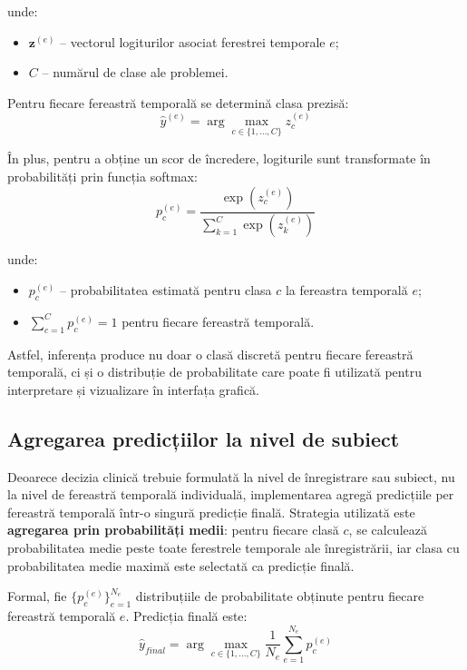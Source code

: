 \documentclass[12pt,a4paper]{report}
\theoremstyle{definition}
\theoremstyle{remark}
\begin{document}
\noindent unde:
\begin{itemize}
    \item $\mathbf{z}^{(e)}$ -- vectorul logiturilor asociat ferestrei temporale $e$;
    \item $C$ -- numărul de clase ale problemei.
\end{itemize}

Pentru fiecare fereastră temporală se determină clasa prezisă:
\begin{equation}
    \hat{y}^{(e)} = \arg\max_{c \in \{1,\ldots,C\}} z_c^{(e)}
    \label{eq:epoch_prediction}
\end{equation}

În plus, pentru a obține un scor de încredere, logiturile sunt transformate în probabilități prin funcția softmax:
\begin{equation}
    p_c^{(e)} = \frac{\exp(z_c^{(e)})}{\sum_{k=1}^{C} \exp(z_k^{(e)})}
    \label{eq:epoch_softmax}
\end{equation}

\noindent unde:
\begin{itemize}
    \item $p_c^{(e)}$ -- probabilitatea estimată pentru clasa $c$ la fereastra temporală $e$;
    \item $\sum_{c=1}^{C} p_c^{(e)} = 1$ pentru fiecare fereastră temporală.
\end{itemize}

Astfel, inferența produce nu doar o clasă discretă pentru fiecare fereastră temporală, ci și o distribuție de probabilitate care poate fi utilizată pentru interpretare și vizualizare în interfața grafică.

\subsection{Agregarea predicțiilor la nivel de subiect}

Deoarece decizia clinică trebuie formulată la nivel de înregistrare sau subiect, nu la nivel de fereastră temporală individuală, implementarea agregă predicțiile per fereastră temporală într-o singură predicție finală. Strategia utilizată este \textbf{agregarea prin probabilități medii}: pentru fiecare clasă $c$, se calculează probabilitatea medie peste toate ferestrele temporale ale înregistrării, iar clasa cu probabilitatea medie maximă este selectată ca predicție finală.

Formal, fie $\{p_c^{(e)}\}_{e=1}^{N_e}$ distribuțiile de probabilitate obținute pentru fiecare fereastră temporală $e$. Predicția finală este:
\begin{equation}
    \hat{y}_{final} = \arg\max_{c \in \{1,\ldots,C\}}
    \frac{1}{N_e} \sum_{e=1}^{N_e} p_c^{(e)}
    \label{eq:prob_aggregation}
\end{equation}
\end{document}
